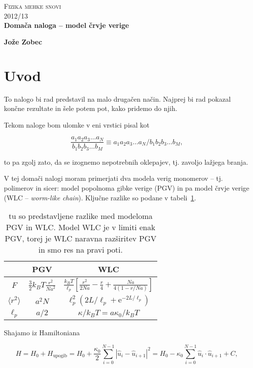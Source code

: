 \documentclass[12pt, a4 paper]{article}
\newcommand{\rr}{
	\ensuremath{\langle r^2 \rangle}
}
\renewcommand{\u}{
	\ensuremath{\hat{u}}
}
\newcommand{\e}{
	\ensuremath{\mathrm{e}}
}
\newcommand{\III}{
	\ensuremath{\frac{Na}{4(1 - r/Na)}}
}
\begin{document}
\begin{center}
\textsc{Fizika mehke snovi}\\
\textsc{2012/13}\\[0.5cm]
\textbf{Doma\v ca naloga -- model \v crvje verige}
\end{center}
\begin{flushright}
\textbf{Jo\v ze Zobec}
\end{flushright}

\section{Uvod}

To nalogo bi rad predstavil na malo druga\v cen na\v cin. Najprej bi rad pokazal kon\v cne rezultate in
\v sele potem pot, kako pridemo do njih.

Tekom naloge bom ulomke v eni vrstici pisal kot

\[
   \frac{a_1 a_2 a_3 \ldots a_N}{b_1 b_2 b_3 \ldots b_M} \equiv a_1 a_2 a_3 \ldots a_N/b_1 b_2 b_3 \ldots b_M,
\]

to pa zgolj zato, da se izognemo nepotrebnih oklepajev, tj. zavoljo la\v zjega branja.

V tej doma\v ci nalogi moram primerjati dva modela verig monomerov -- tj. polimerov in sicer: model
popolnoma gibke verige (PGV) in pa model \v crvje verige (WLC -- \emph{worm-like chain}). Klju\v cne razlike
so podane v tabeli~\ref{tab1}.

\begin{table}[H]
	\centering
	\caption{tu so predstavljene razlike med modeloma PGV in WLC. Model WLC je v limiti enak PGV,
		torej je WLC naravna raz\v siritev PGV in smo res na pravi poti.}
	\vspace{6pt}
	\begin{tabular}{c|c|c}
			& PGV					& WLC \\ \hline
	$F$		& $\frac{3}{2}k_B T\frac{r^2}{Na^2}$	& $\frac{k_B T}{\ell_p}[\frac{r^2}{2Na}
		- \frac{r}{4} + \III]$\\
	$\rr$		& $a^2N$				& $\ell_p^2 (2L/\ell_p + \e^{-2L/\ell_p})$ \\
	$\ell_p$	& $a/2$					& $\kappa/k_B T = a\kappa_0/k_B T$\\
	\end{tabular}
	\label{tab1}
\end{table}

Shajamo iz Hamiltoniana

\begin{equation}
	H = H_0 + H_\text{upogib} = H_0 + \frac{\kappa_0}{2}\sum_{i = 0}^{N-1}|\u_i - \u_{i+1}|^2 =
		H_0 - \kappa_0 \sum_{i = 0}^{N-1}\u_i \cdot \u_{i+1} + C,
	\label{osnova}
\end{equation}
\end{document}
